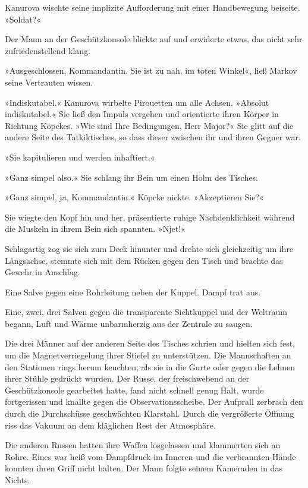 Kanurova wischte seine implizite Aufforderung mit einer
Handbewegung beiseite. »Soldat?«

Der Mann an der Geschützkonsole blickte auf und erwiderte etwas,
das nicht sehr zufriedenstellend klang.

»Ausgeschlossen, Kommandantin. Sie ist zu nah, im toten Winkel«,
ließ Markov seine Vertrauten wissen.

»Indiskutabel.« Kanurova wirbelte Pirouetten um alle Achsen.
»Absolut indiskutabel.« Sie ließ den Impuls vergehen und
orientierte ihren Körper in Richtung Köpckes. »Wie sind Ihre
Bedingungen, Herr Major?« Sie glitt auf die andere Seite des
Tatkiktisches, so dass dieser zwischen ihr und ihren Gegner war.

»Sie kapitulieren und werden inhaftiert.«

»Ganz simpel also.« Sie schlang ihr Bein um einen Holm des
Tisches.

»Ganz simpel, ja, Kommandantin.« Köpcke nickte. »Akzeptieren Sie?«

Sie wiegte den Kopf hin und her, präsentierte ruhige
Nachdenklichkeit während die Muskeln in ihrem Bein sich spannten.
»Njet!«

Schlagartig zog sie sich zum Deck hinunter und drehte sich
gleichzeitig um ihre Längsachse, stemmte sich mit dem Rücken gegen
den Tisch und brachte das Gewehr in Anschlag.

Eine Salve gegen eine Rohrleitung neben der Kuppel. Dampf trat
aus.

Eine, zwei, drei Salven gegen die transparente Sichtkuppel und der
Weltraum begann, Luft und Wärme unbarmherzig aus der Zentrale zu
saugen.

Die drei Männer auf der anderen Seite des Tisches schrien und
hielten sich fest, um die Magnetverriegelung ihrer Stiefel zu
unterstützen. Die Mannschaften an den Stationen rings herum
keuchten, als sie in die Gurte oder gegen die Lehnen ihrer Stühle
gedrückt wurden. Der Russe, der freischwebend an der
Geschützkonsole gearbeitet hatte, fand nicht schnell genug Halt,
wurde fortgerissen und knallte gegen die Observationsscheibe. Der
Aufprall zerbrach den durch die Durchschüsse geschwächten
Klarstahl. Durch die vergrößerte Öffnung riss das Vakuum an dem
kläglichen Rest der Atmosphäre.

Die anderen Russen hatten ihre Waffen losgelassen und klammerten
sich an Rohre. Eines war heiß vom Dampfdruck im Inneren und die
verbrannten Hände konnten ihren Griff nicht halten. Der Mann folgte
seinem Kameraden in das Nichts.

